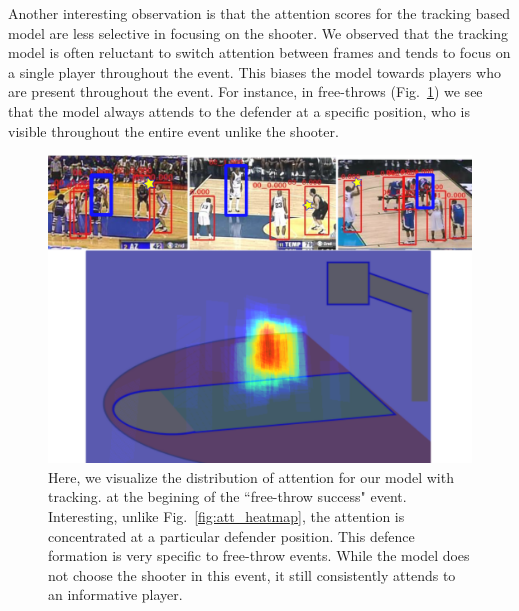 Another interesting observation
is that the
attention scores for the tracking based model are less selective in focusing on
the shooter.  We observed that the tracking model is often reluctant to switch
attention between frames and tends to focus on a single player throughout the
event. This biases the model towards players who are present throughout the
event. For instance, in free-throws (Fig.~\ref{fig:visual_attention_trackspec}) we see that
the model always attends to the defender at a specific position, who is visible
throughout the entire event unlike the shooter.

\begin{figure}[t!]
\begin{center}
   \includegraphics[width=1.0\linewidth]{images/track_spec_output.pdf}
\end{center}
   \caption{Here, we visualize the distribution of attention for our model with tracking.
     at the begining of the ``free-throw success" event. Interesting, unlike Fig.~\ref{fig:att_heatmap},
     the attention is concentrated at a particular defender position. This defence formation
     is very specific to free-throw events. While the model does not
     choose the shooter in this event, it still consistently attends to an informative
   player.}
\label{fig:visual_attention_trackspec}
\end{figure}





